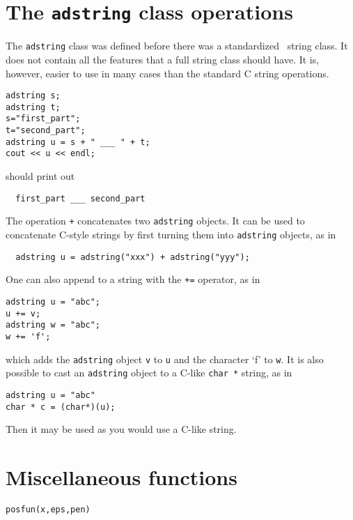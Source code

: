 \section{The \texttt{adstring} class operations}

The \texttt{adstring} class was defined before there was a standardized
\cplus\ string class. It does not contain all the features
that a full string class should have. It is, however, easier to use
in many cases than the standard C string operations.
\begin{lstlisting}
adstring s;
adstring t;
s="first_part";
t="second_part";
adstring u = s + " ___ " + t;
cout << u << endl;
\end{lstlisting}
should print out
\begin{lstlisting}
  first_part ___ second_part
\end{lstlisting}
The operation \texttt{+} concatenates two \texttt{adstring} objects.
It can be used to concatenate C-style strings by first
turning them into \texttt{adstring} objects, as in
\begin{lstlisting}
  adstring u = adstring("xxx") + adstring("yyy");
\end{lstlisting}
One can also append to a string with the \texttt{+=}
operator, as in
\begin{lstlisting}
adstring u = "abc"; 
u += v; 
adstring w = "abc"; 
w += 'f'; 
\end{lstlisting}
which adds the \texttt{adstring} object \texttt{v} to \texttt{u} and the
character `f' to \texttt{w}.
It is also possible to cast an \texttt{adstring} object to
a C-like \texttt{char *} string, as in
\begin{lstlisting}
adstring u = "abc"
char * c = (char*)(u);
\end{lstlisting}
Then it may be used as you would use a C-like string.


\section{Miscellaneous functions}

\begin{lstlisting}
posfun(x,eps,pen)
\end{lstlisting}

